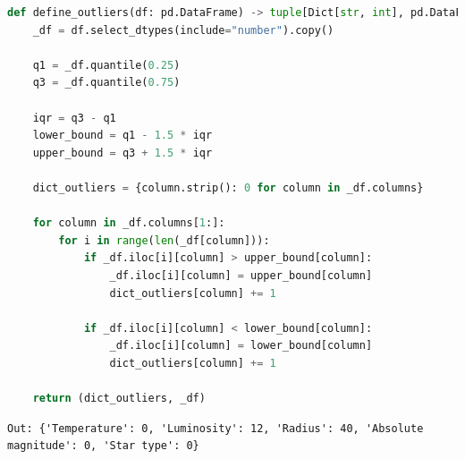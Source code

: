 \documentclass{article}
\begin{document}
    \begin{lstlisting}[language=Python]
def define_outliers(df: pd.DataFrame) -> tuple[Dict[str, int], pd.DataFrame]:
    _df = df.select_dtypes(include="number").copy()

    q1 = _df.quantile(0.25)
    q3 = _df.quantile(0.75)

    iqr = q3 - q1
    lower_bound = q1 - 1.5 * iqr
    upper_bound = q3 + 1.5 * iqr

    dict_outliers = {column.strip(): 0 for column in _df.columns}

    for column in _df.columns[1:]:
        for i in range(len(_df[column])):
            if _df.iloc[i][column] > upper_bound[column]:
                _df.iloc[i][column] = upper_bound[column]
                dict_outliers[column] += 1

            if _df.iloc[i][column] < lower_bound[column]:
                _df.iloc[i][column] = lower_bound[column]
                dict_outliers[column] += 1

    return (dict_outliers, _df)
    \end{lstlisting}
    \begin{lstlisting}[style=Jupyter]
Out: {'Temperature': 0, 'Luminosity': 12, 'Radius': 40, 'Absolute magnitude': 0, 'Star type': 0}
    \end{lstlisting}
    
    \newpage
\end{document}
